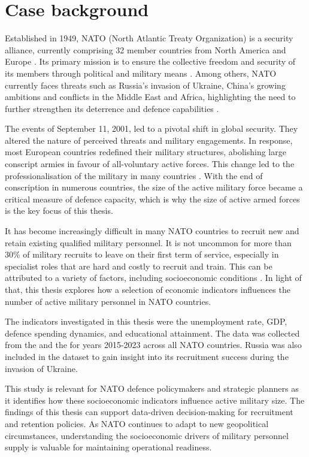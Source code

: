 \chapter{Case background}

Established in 1949, NATO (North Atlantic Treaty Organization) is a security alliance, currently comprising 32 member countries from North America and Europe \parencite{nato_what_nodate, us_mission_to_nato_about_nodate}.
Its primary mission is to ensure the collective freedom and security of its members through political and military means \parencite{us_mission_to_nato_about_nodate}. 
Among others, NATO currently faces threats such as  Russia's invasion of Ukraine, China's growing ambitions and conflicts in the Middle East and Africa, highlighting the need to further strengthen its deterrence and defence capabilities \parencite{nato_nato_2022}.

The events of September 11, 2001, led to a pivotal shift in global security. They altered the nature of perceived threats and military engagements. 
In response, most European countries redefined their military structures, abolishing large conscript armies in favour of all-voluntary active forces. 
This change led to the professionalisation of the military in many countries \parencite{herranen_professional_2004}.
With the end of conscription in numerous countries, the size of the active military force became a critical measure of defence capacity, which is why the size of active armed forces is the key focus of this thesis.

It has become increasingly difficult in many NATO countries to recruit new 
and retain existing qualified military personnel. 
It is not uncommon for more than 30\% of military recruits to leave on their first term of service, especially in specialist roles that are hard and costly to recruit and train.
This can be attributed to a variety of factors, including socioeconomic conditions \parencite{nato_research_and_technology_organization_recruiting_2007}.
In light of that, this thesis explores how a selection of economic indicators influences the number of active military personnel in NATO countries.

The indicators investigated in this thesis were the unemployment rate, GDP, defence spending dynamics, and educational attainment. 
The data was collected from the \textcite{noauthor_world_bank_nodate} and the \textcite{noauthor_military_balance_nodate} for years 2015-2023 across all NATO countries. 
Russia was also included in the dataset to gain insight into its recruitment success during the invasion of Ukraine.

This study is relevant for NATO defence policymakers and strategic planners as it identifies how these socioeconomic indicators influence active military size. 
The findings of this thesis can support data-driven decision-making for recruitment and retention policies. 
As NATO continues to adapt to new geopolitical circumstances, understanding the socioeconomic drivers of military personnel supply is valuable for maintaining operational readiness.
